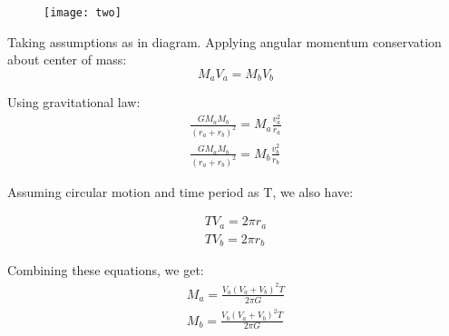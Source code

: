 \documentclass[12pt, letterpaper]{article}
\begin{document}
\begin{figure}[h]
	\centering
    \texttt{[image: two]}
\end{figure}

Taking assumptions as in diagram. Applying angular momentum conservation about center of mass:
\[
	M_aV_a = M_bV_b
\]

Using gravitational law:
\begin{gather*}
\frac{GM_aM_b}{(r_a + r_b)^2} = M_a\frac{v_a^2}{r_a}\\
\frac{GM_aM_b}{(r_a + r_b)^2} = M_b\frac{v_b^2}{r_b}
\end{gather*}

Assuming circular motion and time period as T, we also have:

\begin{gather*}
TV_a = 2\pi r_a\\
TV_b = 2\pi r_b
\end{gather*}

Combining these equations, we get:
\begin{gather*}
M_a = \frac{V_a(V_a+V_b)^2 T}{2 \pi G}\\
M_b = \frac{V_b(V_a+V_b)^2 T}{2 \pi G}
\end{gather*}
\end{document}
